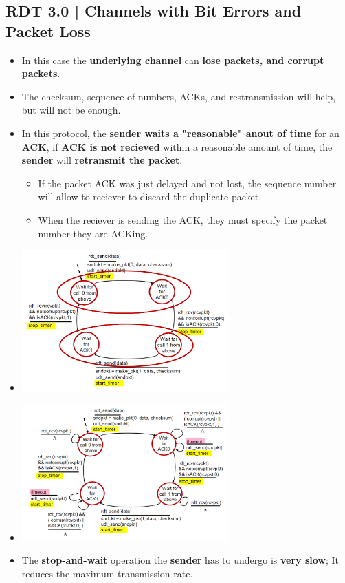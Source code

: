 \documentclass[16pt]{article}
\begin{document}
    \subsection*{RDT 3.0 | Channels with Bit Errors and Packet Loss}
    \begin{itemize}
        \item In this case the \textbf{underlying channel} can \textbf{lose packets, and corrupt packets}.
        \item The checksum, sequence of numbers, ACKs, and restransmission will help, but will not be enough.
        \item In this protocol, the \textbf{sender waits a "reasonable" anout of time} for an \textbf{ACK}, if \textbf{ACK is not recieved} within a reasonable amount of time, the \textbf{sender} will \textbf{retransmit the packet}.
        \begin{itemize}
            \item If the packet ACK was just delayed and not lost, the sequence number will allow to reciever to discard the duplicate packet.
            \item When the reciever is sending the ACK, they must specify the packet number they are ACKing.
        \end{itemize}
        \item[] \begin{center}
                    \includegraphics*[width=300px]{images/RDT-3.0.PNG} 
                \end{center}
        \item[] \begin{center}
                    \includegraphics*[width=300px]{images/RDT-3.0-1.PNG} 
                \end{center}
        \item The \textbf{stop-and-wait} operation the \textbf{sender} has to undergo is \textbf{very slow}; It reduces the maximum transmission rate.
    \end{itemize}
\end{document}
